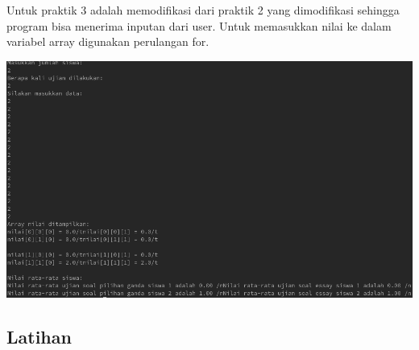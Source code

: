 \documentclass[a4paper,12pt]{article}
\begin{document}
Untuk praktik 3 adalah memodifikasi dari praktik 2 yang dimodifikasi sehingga program bisa menerima inputan dari user. Untuk memasukkan nilai ke dalam variabel
array digunakan perulangan for.
\begin{center}
    \includegraphics[width=\linewidth]{3.png}
\end{center}

\subsection{Latihan}
\end{document}
